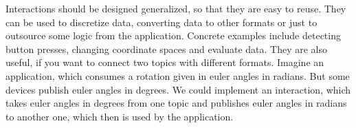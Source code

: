 Interactions should be designed generalized, so that they are easy to reuse. They can be used to discretize data, converting data to other formats or just to outsource some logic from the application. Concrete examples include detecting button presses, changing coordinate spaces and evaluate data.
They are also useful, if you want to connect two topics with different formats. Imagine an application, which consumes a rotation given in euler angles in radians. But some devices publish euler angles in degrees. We could implement an interaction, which takes euler angles in degrees from one topic and publishes euler angles in radians to another one, which then is used by the application.